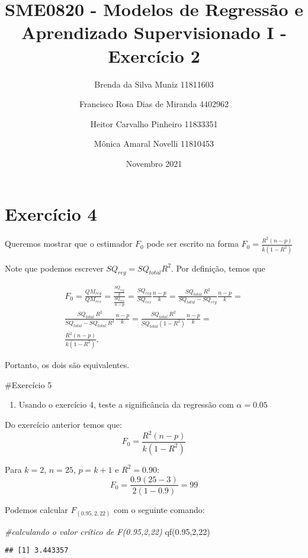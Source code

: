 \documentclass[
]{article}
\title{SME0820 - Modelos de Regressão e Aprendizado Supervisionado I -
Exercício 2}
\author{Brenda da Silva Muniz 11811603 \and Francisco Rosa Dias de
Miranda 4402962 \and Heitor Carvalho Pinheiro 11833351 \and Mônica
Amaral Novelli 11810453}
\date{Novembro 2021}
\newenvironment{Shaded}{\begin{snugshade}}{\end{snugshade}}
\newcommand{\CommentTok}[1]{\textcolor[rgb]{0.56,0.35,0.01}{\textit{#1}}}
\newcommand{\DecValTok}[1]{\textcolor[rgb]{0.00,0.00,0.81}{#1}}
\newcommand{\FloatTok}[1]{\textcolor[rgb]{0.00,0.00,0.81}{#1}}
\newcommand{\FunctionTok}[1]{\textcolor[rgb]{0.00,0.00,0.00}{#1}}
\newcommand{\NormalTok}[1]{#1}
\providecommand{\tightlist}{%
  \setlength{\itemsep}{0pt}\setlength{\parskip}{0pt}}
\begin{document}
\maketitle

\hypertarget{exercuxedcio-4}{%
\section{Exercício 4}\label{exercuxedcio-4}}

Queremos mostrar que o estimador \(F_0\) pode ser escrito na forma
\(F_0 = \frac{R^2(n-p)}{k(1-R^2)}\)

Note que podemos escrever \(SQ_{reg} = SQ_{total} R^2\). Por definição,
temos que

\[\begin{aligned}
F_0 = \frac{QM_{reg}}{QM_{res}} = \frac{\frac{SQ_{reg}}{k}}{\frac{SQ_{res}}{n-p}} = \frac{SQ_{reg}}{SQ_{res}} \frac{n-p}k = \frac{SQ_{total}\ R^2}{SQ_{total} - SQ_{reg}}  \frac{n-p}{k} = \\
\frac{SQ_{total}\ R^2}{SQ_{total} - SQ_{total}\ R^2}  \frac{n-p}{k} = 
\frac{SQ_{total}\ R^2}{SQ_{total} ( 1- R^2)}  \frac{n-p}{k} = \\
\frac{R^2(n-p)}{k (1- R^2)}.
\end{aligned}\]

Portanto, os dois são equivalentes.

\#Exercício 5

\begin{enumerate}
\def\labelenumi{\alph{enumi})}
\tightlist
\item
  Usando o exercício 4, teste a significância da regressão com
  \(\alpha = 0.05\)
\end{enumerate}

Do exercício anterior temos que: \[F_0 = \frac{R^2(n-p)}{k (1- R^2)}\]

Para \(k = 2\), \(n = 25\), \(p=k+1\) e \(R^2 = 0.90\):
\[F_0 = \frac{0.9(25-3)}{2 (1- 0.9)} = 99\]

Podemos calcular \(F_{(0.95,2,22)}\) com o seguinte comando:

\begin{Shaded}
\begin{Highlighting}[]
\CommentTok{\#calculando o valor crítico de F(0.95,2,22)}
\FunctionTok{qf}\NormalTok{(}\FloatTok{0.95}\NormalTok{,}\DecValTok{2}\NormalTok{,}\DecValTok{22}\NormalTok{)}
\end{Highlighting}
\end{Shaded}

\begin{verbatim}
## [1] 3.443357
\end{verbatim}
\end{document}
